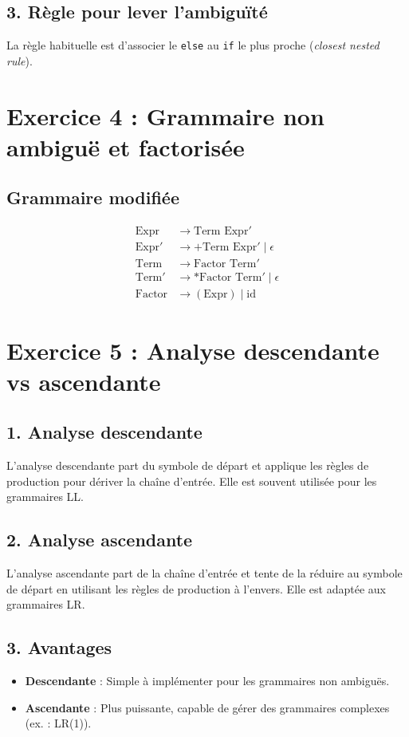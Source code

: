 \documentclass[12pt]{article}
\begin{document}
\subsection*{3. Règle pour lever l'ambiguïté}
La règle habituelle est d'associer le \texttt{else} au \texttt{if} le plus proche (\textit{closest nested rule}).

\section*{Exercice 4 : Grammaire non ambiguë et factorisée}

\subsection*{Grammaire modifiée}
\[
\begin{aligned}
\text{Expr} &\rightarrow \text{Term } \text{Expr}' \\
\text{Expr}' &\rightarrow + \text{Term } \text{Expr}' \mid \epsilon \\
\text{Term} &\rightarrow \text{Factor } \text{Term}' \\
\text{Term}' &\rightarrow * \text{Factor } \text{Term}' \mid \epsilon \\
\text{Factor} &\rightarrow (\text{Expr}) \mid \text{id}
\end{aligned}
\]

\section*{Exercice 5 : Analyse descendante vs ascendante}

\subsection*{1. Analyse descendante}
L'analyse descendante part du symbole de départ et applique les règles de production pour dériver la chaîne d'entrée. Elle est souvent utilisée pour les grammaires LL.

\subsection*{2. Analyse ascendante}
L'analyse ascendante part de la chaîne d'entrée et tente de la réduire au symbole de départ en utilisant les règles de production à l'envers. Elle est adaptée aux grammaires LR.

\subsection*{3. Avantages}
\begin{itemize}
    \item \textbf{Descendante} : Simple à implémenter pour les grammaires non ambiguës.
    \item \textbf{Ascendante} : Plus puissante, capable de gérer des grammaires complexes (ex. : LR(1)).
\end{itemize}
\end{document}
